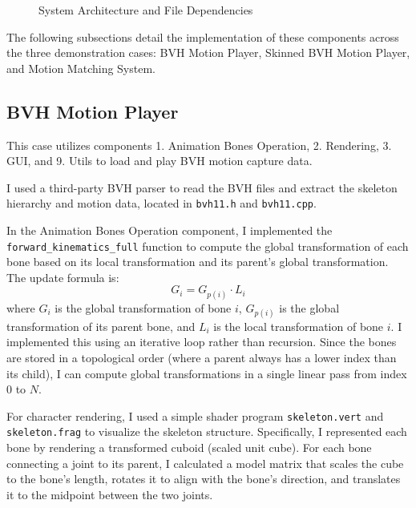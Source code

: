 \documentclass[8pt,a4paper]{extarticle}
\begin{document}
\begin{figure}[h!]
    \caption{System Architecture and File Dependencies}
    \label{fig:arch_dep}
\end{figure}

The following subsections detail the implementation of these components across the three demonstration cases: BVH Motion Player, Skinned BVH Motion Player, and Motion Matching System.

\subsection{BVH Motion Player}
This case utilizes components 1. Animation Bones Operation, 2. Rendering, 3. GUI, and 9. Utils to load and play BVH motion capture data.

I used a third-party BVH parser to read the BVH files and extract the skeleton hierarchy and motion data, located in \texttt{bvh11.h} and \texttt{bvh11.cpp}.

In the Animation Bones Operation component, I implemented the \texttt{forward\_kinematics\_full} function to compute the global transformation of each bone based on its local transformation and its parent's global transformation. The update formula is:
\[
    G_i = G_{p(i)} \cdot L_i
\]
where \(G_i\) is the global transformation of bone \(i\), \(G_{p(i)}\) is the global transformation of its parent bone, and \(L_i\) is the local transformation of bone \(i\). I implemented this using an iterative loop rather than recursion. Since the bones are stored in a topological order (where a parent always has a lower index than its child), I can compute global transformations in a single linear pass from index $0$ to $N$.

For character rendering, I used a simple shader program \texttt{skeleton.vert} and \texttt{skeleton.frag} to visualize the skeleton structure. Specifically, I represented each bone by rendering a transformed cuboid (scaled unit cube). For each bone connecting a joint to its parent, I calculated a model matrix that scales the cube to the bone's length, rotates it to align with the bone's direction, and translates it to the midpoint between the two joints.
\end{document}
